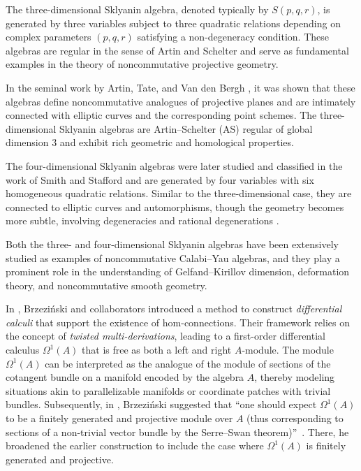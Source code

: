 \documentclass{amsart}
\theoremstyle{definition}
\theoremstyle{remark}
\numberwithin{equation}{section}
\begin{document}
The three-dimensional Sklyanin algebra, denoted typically by $S(p,q,r)$, is generated by three variables subject to three quadratic relations depending on complex parameters $(p,q,r)$ satisfying a non-degeneracy condition. These algebras are regular in the sense of Artin and Schelter and serve as fundamental examples in the theory of noncommutative projective geometry.

In the seminal work by Artin, Tate, and Van den Bergh \cite{ArtinTateVandenBergh1990}, it was shown that these algebras define noncommutative analogues of projective planes and are intimately connected with elliptic curves and the corresponding point schemes. The three-dimensional Sklyanin algebras are Artin–Schelter (AS) regular of global dimension 3 and exhibit rich geometric and homological properties.

The four-dimensional Sklyanin algebras were later studied and classified in the work of Smith and Stafford \cite{SmithStafford1992} and are generated by four variables with six homogeneous quadratic relations. Similar to the three-dimensional case, they are connected to elliptic curves and automorphisms, though the geometry becomes more subtle, involving degeneracies and rational degenerations \cite{LevasseurStafford1991}.

Both the three- and four-dimensional Sklyanin algebras have been extensively studied as examples of noncommutative Calabi–Yau algebras, and they play a prominent role in the understanding of Gelfand–Kirillov dimension, deformation theory, and noncommutative smooth geometry.

In \cite{BrzezinskiElKaoutitLomp2010}, Brzezi{\'n}ski and collaborators introduced a method to construct {\em differential calculi} that support the existence of hom-connections. Their framework relies on the concept of {\em twisted multi-derivations}, leading to a first-order differential calculus $\Omega^1(A)$ that is free as both a left and right $A$-module. The module $\Omega^1(A)$ can be interpreted as the analogue of the module of sections of the cotangent bundle on a manifold encoded by the algebra $A$, thereby modeling situations akin to parallelizable manifolds or coordinate patches with trivial bundles. Subsequently, in \cite{Brzezinski2011}, Brzezi{\'n}ski suggested that \textquotedblleft one should expect $\Omega^1(A)$ to be a finitely generated and projective module over $A$ (thus corresponding to sections of a non-trivial vector bundle by the Serre--Swan theorem)\textquotedblright\ \cite[p.~885]{Brzezinski2011}. There, he broadened the earlier construction to include the case where $\Omega^1(A)$ is finitely generated and projective.
\end{document}
